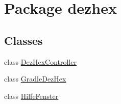 \hypertarget{namespacedezhex}{}\section{Package dezhex}
\label{namespacedezhex}
\subsection*{Classes}
\begin{DoxyCompactItemize}
\item 
class \hyperlink{classdezhex_1_1_dez_hex_controller}{Dez\+Hex\+Controller}
\item 
class \hyperlink{classdezhex_1_1_gradle_dez_hex}{Gradle\+Dez\+Hex}
\item 
class \hyperlink{classdezhex_1_1_hilfe_fenster}{Hilfe\+Fenster}
\end{DoxyCompactItemize}
